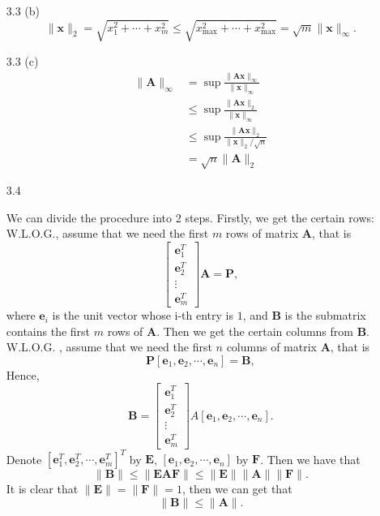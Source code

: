 \begin{enumerate}
    \item[3.3 (b)] {
        $$
        \| \bm{x}\|_2 = \sqrt{x_1^2 + \cdots + x_m^2} \leq \sqrt{x^2_{\max} + \cdots + x_{\max}^2} = \sqrt{m} \| \bm{x} \|_{\infty}.
        $$
    }

    \item[3.3 (c)] {
        $$
        \begin{aligned}
        \|\bm{A}\|_{\infty} & = \sup \frac{\| \bm{Ax} \|_{\infty}}{\|\bm{x}\|_{\infty}} \\
        & \leq \sup \frac{\| \bm{Ax} \|_{2}}{\|\bm{x}\|_{\infty}} \\
        & \leq \sup \frac{\| \bm{Ax} \|_{2}}{\|\bm{x}\|_{2}/\sqrt{n}} \\
        & = \sqrt{n} \| \bm{A} \|_2
        \end{aligned}
        $$
    }

    \item[3.4] {
        We can divide the procedure into 2 steps. Firstly, we get the certain rows: W.L.O.G., assume that we need
        the first $m$ rows of matrix $\bm{A}$, that is
        $$
        \begin{bmatrix}
            \bm{e}^T_1 \\
            \bm{e}^T_2 \\
            \vdots \\
            \bm{e}^T_m
        \end{bmatrix} \bm{A} = \bm{P},
        $$
        where $\bm{e}_i$ is the unit vector whose i-th entry is $1$, and $\bm{B}$ is the submatrix contains the first $m$ rows of $\bm{A}$. Then
        we get the certain columns from $\bm{B}$. W.L.O.G. , assume that we need the first $n$ columns of matrix $\bm{A}$, that is  
        $$
        \bm{P} [\bm{e}_1, \bm{e}_2 ,\cdots, \bm{e}_n ] = \bm{B},
        $$
        Hence,
        $$
        \bm{B} = \begin{bmatrix}
            \bm{e}^T_1 \\
            \bm{e}^T_2 \\
            \vdots \\
            \bm{e}^T_m
        \end{bmatrix} A [\bm{e}_1, \bm{e}_2 ,\cdots, \bm{e}_n ].
        $$
        Denote $ [\bm{e}^T_1, \bm{e}^T_2 ,\cdots, \bm{e}^T_m ]^{T} $ by $\bm{E}$, $[\bm{e}_1, \bm{e}_2 ,\cdots, \bm{e}_n ]$ by $\bm{F}$. Then we have that
        $$
        \| \bm{B}\| \leq \|\bm{EAF} \| \leq \| \bm{E} \| \| \bm{A} \| \| \bm{F} \|.
        $$
        It is clear that $\| \bm{E}\| = \| \bm{F} \| = 1$, then we can get that
        $$
        \| \bm{B} \| \leq \| \bm{A} \|.
        $$

}
\end{enumerate}

